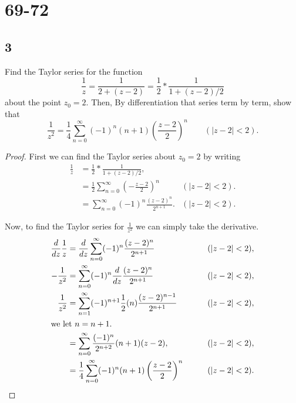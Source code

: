 \documentclass{article}
\begin{document}
\section*{69-72}
\subsection*{3}
Find the Taylor series for the function
\[\frac{1}{z}=\frac{1}{2 + (z-2)}=\frac{1}{2}*\frac{1}{1+(z-2)/2}\]
about the point $z_0=2$. Then, By differentiation that series term by term, show
that
\[\frac{1}{z^2} = \frac{1}{4}\sum_{n=0}^\infty (-1)^n(n+1)\left(\frac{z-2}{2}\right)^n
    \qquad (|z-2|<2).\]
\begin{proof}
    First we can find the Taylor series about $z_0=2$ by writing
    \begin{align*}
        \frac{1}{z} & = \frac{1}{2}*\frac{1}{1+(z-2)/2},                           \\
                    & = \frac{1}{2}\sum_{n=0}^\infty \left(-\frac{z-2}{2}\right)^n
                    & (|z-2|<2).                                                   \\
                    & = \sum_{n=0}^\infty (-1)^n\frac{(z-2)^n}{2^{n+1}}.
                    & (|z-2|<2).
    \end{align*}

    Now, to find the Taylor series for $\frac{1}{z^2}$ we can simply take the
    derivative.
    \begin{align*}
        \frac{d}{dz}\frac{1}{z} & = \frac{d}{dz}\sum_{n=0}^\infty (-1)^n\frac{(z-2)^n}{2^{n+1}}
                                & \qquad (|z-2|<2),                                                       \\
        -\frac{1}{z^2}          & = \sum_{n=0}^\infty (-1)^n\frac{d}{dz}\frac{(z-2)^n}{2^{n+1}}
                                & \qquad (|z-2|<2),                                                       \\
        \frac{1}{z^2}           & = \sum_{n=1}^\infty (-1)^{n+1}\frac{1}{2}(n)\frac{(z-2)^{n-1}}{2^{n+1}}
                                & \qquad (|z-2|<2),                                                       \\
        \intertext{we let $n=n+1$.}
                                & = \sum_{n=0}^\infty \frac{(-1)^n}{2^{n+2}} (n+1)(z-2),
                                & \qquad (|z-2|<2),                                                       \\
                                & = \frac{1}{4}\sum_{n=0}^\infty (-1)^n(n+1)\left(\frac{z-2}{2}\right)^n
                                & \qquad (|z-2|<2).                                                       \\
    \end{align*}
\end{proof}
\end{document}

